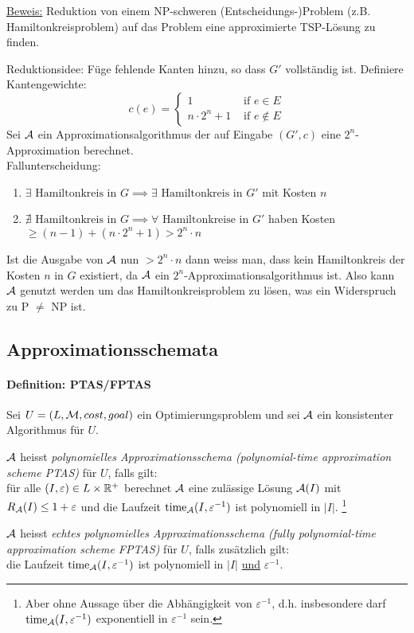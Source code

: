 \underline{Beweis:}
Reduktion von einem NP-schweren (Entscheidungs-)Problem (z.B. Hamiltonkreisproblem) auf das Problem eine
approximierte TSP-Lösung zu finden.

Reduktionsidee: Füge fehlende Kanten hinzu, so dass $G'$ vollständig ist.
Definiere Kantengewichte:
$$ c(e) = \begin{cases}
1 & \text{ if } e \in E \\
n \cdot 2^n + 1 & \text{ if } e \notin E
\end{cases} $$
Sei $\mathcal{A}$ ein Approximationsalgorithmus der auf Eingabe $(G', c)$ eine $2^n$-Approximation berechnet.
\\
Fallunterscheidung:
\begin{enumerate}
    \item $\exists \text{ Hamiltonkreis in } G \implies \exists \text{ Hamiltonkreis in } G' $ mit Kosten $n$
    \item $\nexists \text{ Hamiltonkreis in } G \implies \forall \text{ Hamiltonkreise in } G' $ haben Kosten
    $\geq (n-1) + (n \cdot 2^n + 1) > 2^n \cdot n $
\end{enumerate}
Ist die Ausgabe von $\mathcal{A}$ nun $> 2^n \cdot n$ dann weiss man, dass kein Hamiltonkreis der Kosten $n$ in $G$ existiert,
da $\mathcal{A}$ ein $2^n$-Approximationsalgorithmus ist.
Also kann $\mathcal{A}$ genutzt werden um das Hamiltonkreisproblem zu lösen, was ein Widerspruch zu P $\neq$ NP ist.


\subsection{Approximationsschemata}

\paragraph{Definition: PTAS/FPTAS}
{
\newcommand{\eps}{\varepsilon^{-1}}
Sei $U = (L, \mathcal{M}, cost, goal)$ ein Optimierungsproblem und sei $\mathcal{A}$ ein konsistenter Algorithmus für $U$.

$\mathcal{A}$ heisst \emph{polynomielles Approximationsschema (polynomial-time approximation scheme PTAS)}
für $U$, falls gilt: \\
für alle $(I,\varepsilon) \in L \times \mathbb{R}^+$ berechnet $\mathcal{A}$ eine zulässige Lösung $\mathcal{A}(I)$ mit
$R_{\mathcal{A}}(I) \leq 1+\varepsilon$ und die Laufzeit $\Time_\A(I, \eps)$ ist polynomiell in $|I|$.%
\footnote{Aber ohne Aussage über die Abhängigkeit von $\eps$, d.h. insbesondere darf $\Time_\A(I, \eps)$
exponentiell in $\eps$ sein.}

$\mathcal{A}$ heisst \emph{echtes polynomielles Approximationsschema (fully polynomial-time approximation scheme FPTAS)}
für $U$, falls zusätzlich gilt: \\
die Laufzeit $\Time_\A(I, \eps)$ ist polynomiell in $|I|$ \underline{und} $\eps$.
}

